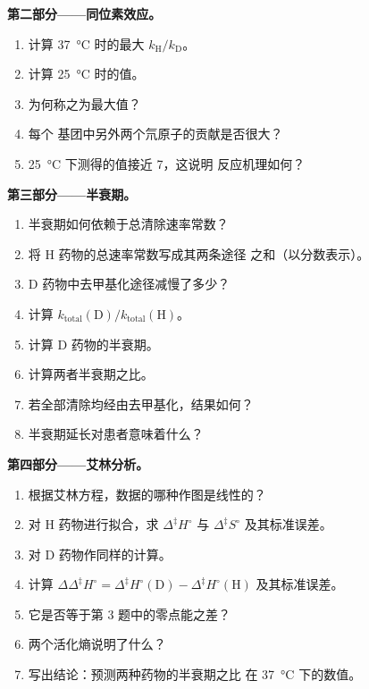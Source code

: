 \begin{problem}
\medskip\noindent\textbf{第二部分——同位素效应。}
\begin{enumerate}[resume]
  \item 计算 \qty{37}{\celsius} 时的最大 $k_{\mathrm H}/k_{\mathrm D}$。
  \item 计算 \qty{25}{\celsius} 时的值。
  \item 为何称之为最大值？
  \item 每个  基团中另外两个氘原子的贡献是否很大？
  \item \qty{25}{\celsius} 下测得的值接近 7，这说明
        反应机理如何？
\end{enumerate}

\medskip\noindent\textbf{第三部分——半衰期。}
\begin{enumerate}[resume]
  \item 半衰期如何依赖于总清除速率常数？
  \item 将 H 药物的总速率常数写成其两条途径
        之和（以分数表示）。
  \item D 药物中去甲基化途径减慢了多少？
  \item 计算 $k_{\mathrm{total}}(\mathrm D)/k_{\mathrm{total}}(\mathrm H)$。
  \item 计算 D 药物的半衰期。
  \item 计算两者半衰期之比。
  \item 若全部清除均经由去甲基化，结果如何？
  \item 半衰期延长对患者意味着什么？
\end{enumerate}

\medskip\noindent\textbf{第四部分——艾林分析。}
\begin{enumerate}[resume]
  \item 根据艾林方程，数据的哪种作图是线性的？
  \item 对 H 药物进行拟合，求 $\Delta^{\ddagger}H^\circ$ 与 $\Delta^{\ddagger}S^\circ$ 及其标准误差。
  \item 对 D 药物作同样的计算。
  \item 计算 $\Delta\Delta^{\ddagger}H^\circ = \Delta^{\ddagger}H^\circ(\mathrm D) - \Delta^{\ddagger}H^\circ(\mathrm H)$ 及其标准误差。
  \item 它是否等于第 3 题中的零点能之差？
  \item 两个活化熵说明了什么？
  \item 写出结论：预测两种药物的半衰期之比
        在 \qty{37}{\celsius} 下的数值。
\end{enumerate}
\end{problem}
